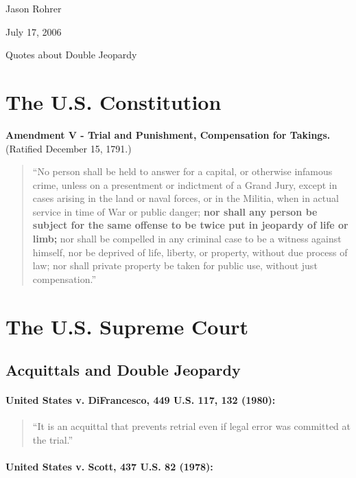 \documentclass[12pt]{article}
\begin{document}
\noindent Jason Rohrer

\noindent July 17, 2006


\begin{center}
{\Huge Quotes about Double Jeopardy}
\end{center}

\section{The U.S. Constitution}

{\bf Amendment V - Trial and Punishment, Compensation for Takings.}  (Ratified December 15, 1791.)

\begin{quote}
``No person shall be held to answer for a capital, or otherwise infamous crime, unless on a presentment or indictment of a Grand Jury, except in cases arising in the land or naval forces, or in the Militia, when in actual service in time of War or public danger; {\bf nor shall any person be subject for the same offense to be twice put in jeopardy of life or limb;} nor shall be compelled in any criminal case to be a witness against himself, nor be deprived of life, liberty, or property, without due process of law; nor shall private property be taken for public use, without just compensation.''
\end{quote}


\section{The U.S. Supreme Court}

\subsection{Acquittals and Double Jeopardy}


\paragraph{United States v. DiFrancesco, 449 U.S. 117, 132 (1980):}

\begin{quote}
``It is an acquittal that prevents retrial even if legal error was committed at the trial.''
\end{quote}


\paragraph{United States v. Scott, 437 U.S. 82 (1978):}
\end{document}
